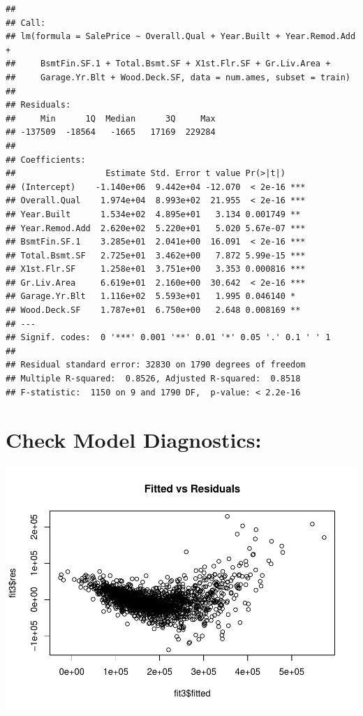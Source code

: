 \documentclass[
]{article}
\newenvironment{Shaded}{\begin{snugshade}}{\end{snugshade}}
\newcommand{\CommentTok}[1]{\textcolor[rgb]{0.56,0.35,0.01}{\textit{#1}}}
\newcommand{\DataTypeTok}[1]{\textcolor[rgb]{0.13,0.29,0.53}{#1}}
\newcommand{\KeywordTok}[1]{\textcolor[rgb]{0.13,0.29,0.53}{\textbf{#1}}}
\newcommand{\NormalTok}[1]{#1}
\newcommand{\OperatorTok}[1]{\textcolor[rgb]{0.81,0.36,0.00}{\textbf{#1}}}
\newcommand{\StringTok}[1]{\textcolor[rgb]{0.31,0.60,0.02}{#1}}
\begin{document}
\begin{verbatim}
## 
## Call:
## lm(formula = SalePrice ~ Overall.Qual + Year.Built + Year.Remod.Add + 
##     BsmtFin.SF.1 + Total.Bsmt.SF + X1st.Flr.SF + Gr.Liv.Area + 
##     Garage.Yr.Blt + Wood.Deck.SF, data = num.ames, subset = train)
## 
## Residuals:
##     Min      1Q  Median      3Q     Max 
## -137509  -18564   -1665   17169  229284 
## 
## Coefficients:
##                  Estimate Std. Error t value Pr(>|t|)    
## (Intercept)    -1.140e+06  9.442e+04 -12.070  < 2e-16 ***
## Overall.Qual    1.974e+04  8.993e+02  21.955  < 2e-16 ***
## Year.Built      1.534e+02  4.895e+01   3.134 0.001749 ** 
## Year.Remod.Add  2.620e+02  5.220e+01   5.020 5.67e-07 ***
## BsmtFin.SF.1    3.285e+01  2.041e+00  16.091  < 2e-16 ***
## Total.Bsmt.SF   2.725e+01  3.462e+00   7.872 5.99e-15 ***
## X1st.Flr.SF     1.258e+01  3.751e+00   3.353 0.000816 ***
## Gr.Liv.Area     6.619e+01  2.160e+00  30.642  < 2e-16 ***
## Garage.Yr.Blt   1.116e+02  5.593e+01   1.995 0.046140 *  
## Wood.Deck.SF    1.787e+01  6.750e+00   2.648 0.008169 ** 
## ---
## Signif. codes:  0 '***' 0.001 '**' 0.01 '*' 0.05 '.' 0.1 ' ' 1
## 
## Residual standard error: 32830 on 1790 degrees of freedom
## Multiple R-squared:  0.8526, Adjusted R-squared:  0.8518 
## F-statistic:  1150 on 9 and 1790 DF,  p-value: < 2.2e-16
\end{verbatim}

\hypertarget{check-model-diagnostics}{%
\section{Check Model Diagnostics:}\label{check-model-diagnostics}}

\begin{Shaded}
\end{Shaded}

\includegraphics{Predicting-Housing-Price_files/figure-latex/unnamed-chunk-4-1.pdf}
\end{document}
